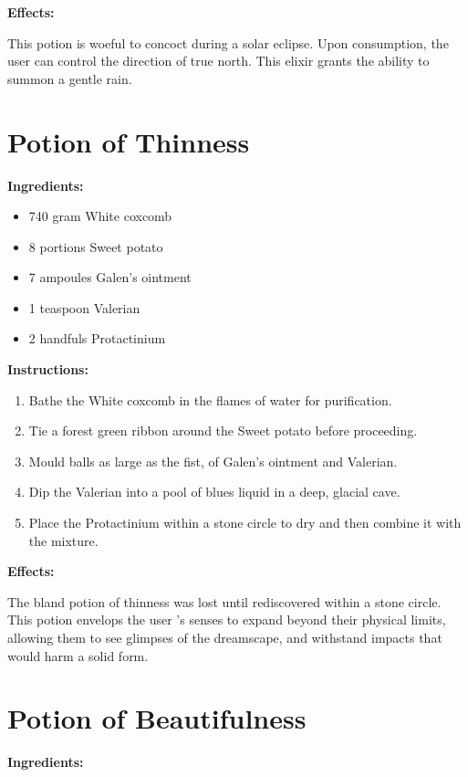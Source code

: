 \documentclass{article}
\begin{document}
\textbf{Effects:}

This potion is woeful to concoct during a solar eclipse. Upon consumption, the user can control the direction of true north. This elixir grants the ability to summon a gentle rain.

\newpage
\section*{Potion of Thinness}

\textbf{Ingredients:}

\begin{itemize}
  \item 740 gram White coxcomb
  \item 8 portions Sweet potato
  \item 7 ampoules Galen's ointment
  \item 1 teaspoon Valerian
  \item 2 handfuls Protactinium
\end{itemize}

\textbf{Instructions:}

\begin{enumerate}
  \item Bathe the White coxcomb in the flames of water for purification.
  \item Tie a forest green ribbon around the Sweet potato before proceeding.
  \item Mould balls as large as the fist, of Galen's ointment and Valerian.
  \item Dip the Valerian into a pool of blues liquid in a deep, glacial cave.
  \item Place the Protactinium within a stone circle to dry and then combine it with the mixture.
\end{enumerate}

\textbf{Effects:}

The bland potion of thinness was lost until rediscovered within a stone circle. This potion envelops the user 's senses to expand beyond their physical limits, allowing them to see glimpses of the dreamscape, and withstand impacts that would harm a solid form.

\newpage
\section*{Potion of Beautifulness}

\textbf{Ingredients:}
\end{document}
